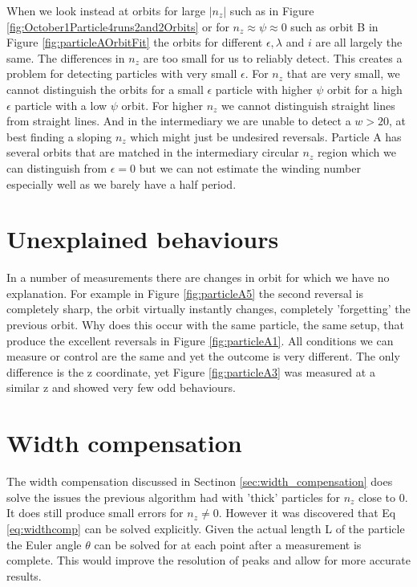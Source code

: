 When we look instead at orbits for large $\left| n_z \right|$ such as in Figure 
\ref{fig:October1Particle4runs2and2Orbits} or for $n_z \approx \psi \approx 0$ such as orbit B in Figure 
\ref{fig:particleAOrbitFit} the orbits for different $\epsilon, \lambda$ 
and $i$ are all largely the same. The differences in $n_z$ are too small for us to reliably detect. This creates a problem for 
detecting particles with very small $\epsilon$. For $n_z$ that are very small, we cannot distinguish the orbits for a 
small $\epsilon$ particle with higher $\psi$ orbit for a high $\epsilon$ particle with a low $\psi$ orbit. For higher 
$n_z$ we cannot distinguish straight lines from straight lines. And in the intermediary we are unable to detect a $w 
> 20$, at best finding a sloping $n_z$ which might just be undesired reversals. Particle A has several orbits that 
are matched in the intermediary circular $n_z$ region which we can distinguish from $\epsilon = 0$ but we can not 
estimate the winding number especially well as we barely have a half period. 


\section{Unexplained behaviours}
In a number of measurements there are changes in orbit for which we have no explanation. For example in Figure \ref{fig:particleA5} the second reversal is completely sharp, the orbit virtually instantly changes, completely 'forgetting' the previous orbit. Why does this occur with the same particle, the same setup, that produce the excellent reversals in Figure \ref{fig:particleA1}. All conditions we can measure or control are the same and yet the outcome is very different. The only difference is the z coordinate, yet Figure \ref{fig:particleA3} was measured at a similar z and showed very few odd behaviours. 

\section{Width compensation}
The width compensation discussed in Sectinon \ref{sec:width_compensation} does solve the issues the previous algorithm had with 'thick' particles for $n_z$ close to 0. It does still produce small errors for $n_z \neq 0$. However it was discovered that Eq \ref{eq:widthcomp} can be solved explicitly. Given the actual length L of the particle the Euler angle $\theta$ can be solved for at each point after a measurement is complete. This would improve the resolution of peaks and allow for more accurate results.
